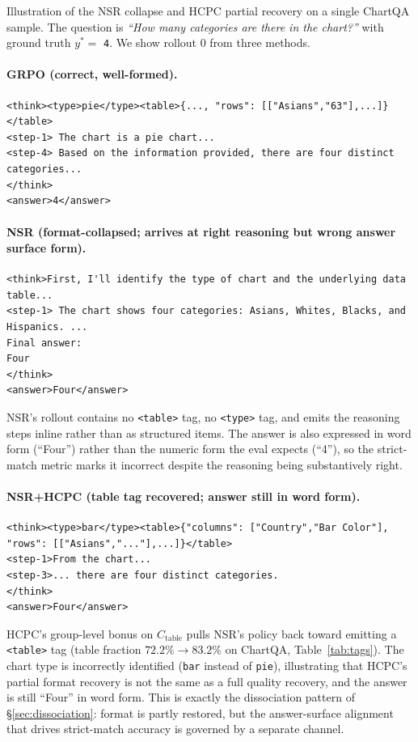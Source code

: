 \documentclass[11pt]{article}
\begin{document}
Illustration of the NSR collapse and HCPC partial recovery on a
single ChartQA sample. The question is \emph{``How many categories
are there in the chart?''} with ground truth $y^* = $ \texttt{4}. We
show rollout 0 from three methods.

\paragraph{GRPO (correct, well-formed).}
\begin{Verbatim}
<think><type>pie</type><table>{..., "rows": [["Asians","63"],...]}</table>
<step-1> The chart is a pie chart...
<step-4> Based on the information provided, there are four distinct categories...
</think>
<answer>4</answer>
\end{Verbatim}

\paragraph{NSR (format-collapsed; arrives at right reasoning but
wrong answer surface form).}
\begin{Verbatim}
<think>First, I'll identify the type of chart and the underlying data table...
<step-1> The chart shows four categories: Asians, Whites, Blacks, and Hispanics. ...
Final answer:
Four
</think>
<answer>Four</answer>
\end{Verbatim}
NSR's rollout contains no \texttt{<table>} tag, no \texttt{<type>}
tag, and emits the reasoning steps inline rather than as structured
items. The answer is also expressed in word form (``Four'') rather
than the numeric form the eval expects (``4''), so the strict-match
metric marks it incorrect despite the reasoning being substantively
right.

\paragraph{NSR+HCPC (table tag recovered; answer still in word
form).}
\begin{Verbatim}
<think><type>bar</type><table>{"columns": ["Country","Bar Color"], "rows": [["Asians","..."],...]}</table>
<step-1>From the chart...
<step-3>... there are four distinct categories.
</think>
<answer>Four</answer>
\end{Verbatim}
HCPC's group-level bonus on $C_{\text{table}}$ pulls NSR's policy
back toward emitting a \texttt{<table>} tag (table fraction
$72.2\%\!\to\!83.2\%$ on ChartQA, Table~\ref{tab:tags}). The chart
type is incorrectly identified (\texttt{bar} instead of \texttt{pie}),
illustrating that HCPC's partial format recovery is not the same as
a full quality recovery, and the answer is still ``Four'' in word
form. This is exactly the dissociation pattern of
\S\ref{sec:dissociation}: format is partly restored, but the
answer-surface alignment that drives strict-match accuracy is
governed by a separate channel.
\end{document}
